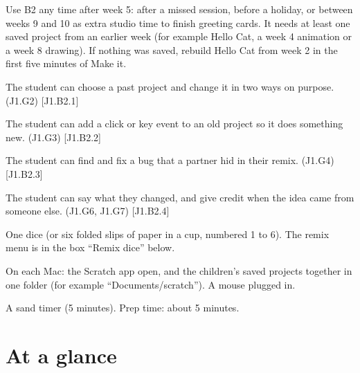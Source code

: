 
\begin{teachernote}
Use B2 any time after week 5: after a missed session, before a holiday, or between weeks 9 and 10 as extra studio time to finish greeting cards. It needs at least one saved project from an earlier week (for example Hello Cat, a week 4 animation or a week 8 drawing). If nothing was saved, rebuild Hello Cat from week 2 in the first five minutes of Make it.
\end{teachernote}

\begin{objectives}
  \item The student can choose a past project and change it in two ways on purpose. (J1.G2) [J1.B2.1]
  \item The student can add a click or key event to an old project so it does something new. (J1.G3) [J1.B2.2]
  \item The student can find and fix a bug that a partner hid in their remix. (J1.G4) [J1.B2.3]
  \item The student can say what they changed, and give credit when the idea came from someone else. (J1.G6, J1.G7) [J1.B2.4]
\end{objectives}

\begin{materials}
  \item One dice (or six folded slips of paper in a cup, numbered 1 to 6). The remix menu is in the box \enquote{Remix dice} below.
  \item On each Mac: the Scratch app open, and the children's saved projects together in one folder (for example \enquote{Documents/scratch}). A mouse plugged in.
  \item A sand timer (5 minutes). Prep time: about 5 minutes.
\end{materials}

\section{At a glance}
\begin{timeplan}
\end{timeplan}

